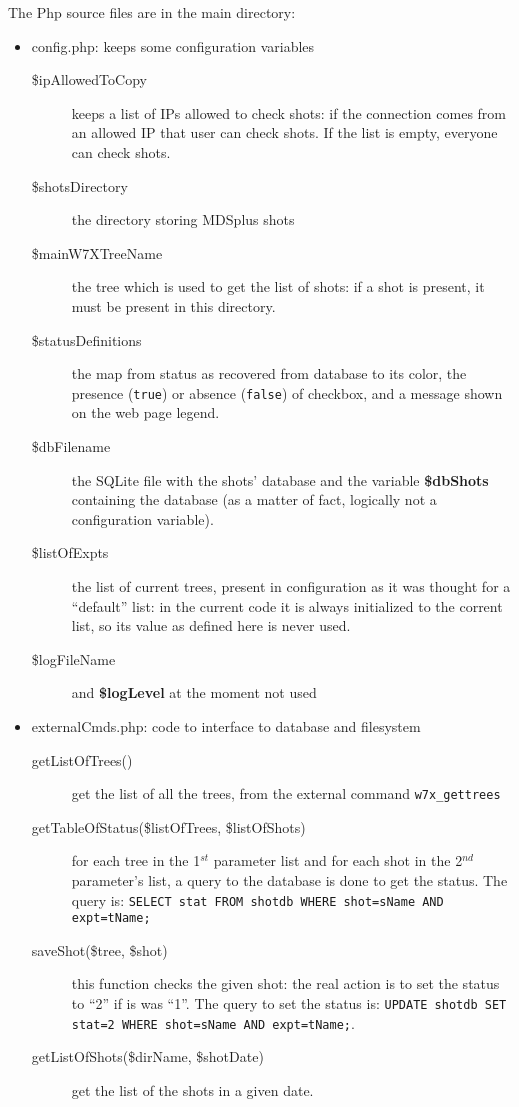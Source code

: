 \documentclass[12pt]{article}
\begin{document}
The Php source files are in the main directory:
\begin{itemize}
\item config.php: keeps some configuration variables
\begin{description}
\item[\$ipAllowedToCopy] keeps a list of IPs allowed to check shots: 
  if the connection comes from an allowed IP that user can check shots.
  If the list is empty, everyone can check shots.
\item[\$shotsDirectory] the directory storing MDSplus shots
\item[\$mainW7XTreeName] the tree which is used to get the list of shots: 
  if a shot is present, it must be present in this directory.
\item[\$statusDefinitions] the map from status as recovered from database to
  its color, the presence (\texttt{true}) or absence (\texttt{false}) of checkbox,
  and a message shown on the web page legend.
\item[\$dbFilename] the SQLite file with the shots' database and the variable \textbf{\$dbShots}
  containing the database (as a matter of fact, logically not a configuration variable).
\item[\$listOfExpts] the list of current trees, present in configuration as it
  was thought for a ``default'' list: in the current code it is always initialized 
  to the corrent list, so its value as defined here is never used.
\item[\$logFileName] and \textbf{\$logLevel} at the moment not used
\end{description}

\item externalCmds.php: code to interface to database and filesystem
\begin{description}
\item[getListOfTrees()] get the list of all the trees, from the external command \texttt{w7x\_gettrees}
\item[getTableOfStatus(\$listOfTrees, \$listOfShots)] for each tree in the 1$^{st}$ parameter list
  and for each shot in the 2$^{nd}$ parameter's list, a query to the database is done to get the status.
  The query is: \texttt{SELECT stat FROM shotdb WHERE shot=sName AND expt=tName;}
\item[saveShot(\$tree, \$shot)] this function checks the given shot: the real action is
  to set the status to ``2'' if is was ``1''. The query to set the status is: \texttt{UPDATE shotdb SET stat=2 WHERE shot=sName AND expt=tName;}.
\item[getListOfShots(\$dirName, \$shotDate)] get the list of the shots in a given date.
\end{description}


\end{itemize}
\end{document}

